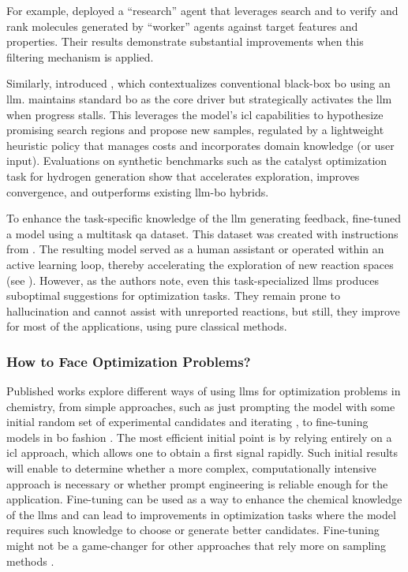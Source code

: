 For example, \textcite{yu2025collaborative} deployed a \enquote{research} agent that leverages  search and  to verify and rank molecules generated by \enquote{worker} agents against target features and properties. 
Their results demonstrate substantial improvements when this filtering mechanism is applied.

Similarly, \textcite{cisse2025language0based} introduced , which contextualizes conventional black-box \gls{bo} using an \gls{llm}.  maintains standard \gls{bo} as the core driver but strategically activates the \gls{llm} when progress stalls. 
This leverages the model’s \gls{icl} capabilities to hypothesize promising search regions and propose new samples, regulated by a lightweight heuristic policy that manages costs and incorporates domain knowledge (or user input). 
Evaluations on synthetic benchmarks such as the catalyst optimization task for hydrogen generation show that  accelerates exploration, improves convergence, and outperforms existing \gls{llm}-\gls{bo} hybrids.

To enhance the task-specific knowledge of the \gls{llm} generating feedback, \textcite{zhang2025large} fine-tuned a  model using a multitask \gls{qa} dataset. This dataset was created with instructions from . 
The resulting model served as a human assistant or operated within an active learning loop, thereby accelerating the exploration of new reaction spaces (see ). 
However, as the authors note, even this task-specialized \glspl{llm} produces suboptimal suggestions for optimization tasks. 
They remain prone to hallucination and cannot assist with unreported reactions, but still, they improve for most of the applications, using pure classical methods.

\subsubsection{How to Face Optimization Problems?}

Published works explore different ways of using \glspl{llm} for optimization problems in chemistry, from simple approaches, such as just prompting the model with some initial random set of experimental candidates and iterating \autocite{ramos2023bayesian}, to fine-tuning models in \gls{bo} fashion \autocite{rankovic2025gollum0}. 
The most efficient initial point is by relying entirely on a \gls{icl} approach, which allows one to obtain a first signal rapidly. 
Such initial results will enable to determine whether a more complex, computationally intensive approach is necessary or whether prompt engineering is reliable enough for the application. 
Fine-tuning can be used as a way to enhance the chemical knowledge of the \glspl{llm} and can lead to improvements in optimization tasks where the model requires such knowledge to choose or generate better candidates. 
Fine-tuning might not be a game-changer for other approaches that rely more on sampling methods \autocite{wang2025llm0augmented}.

